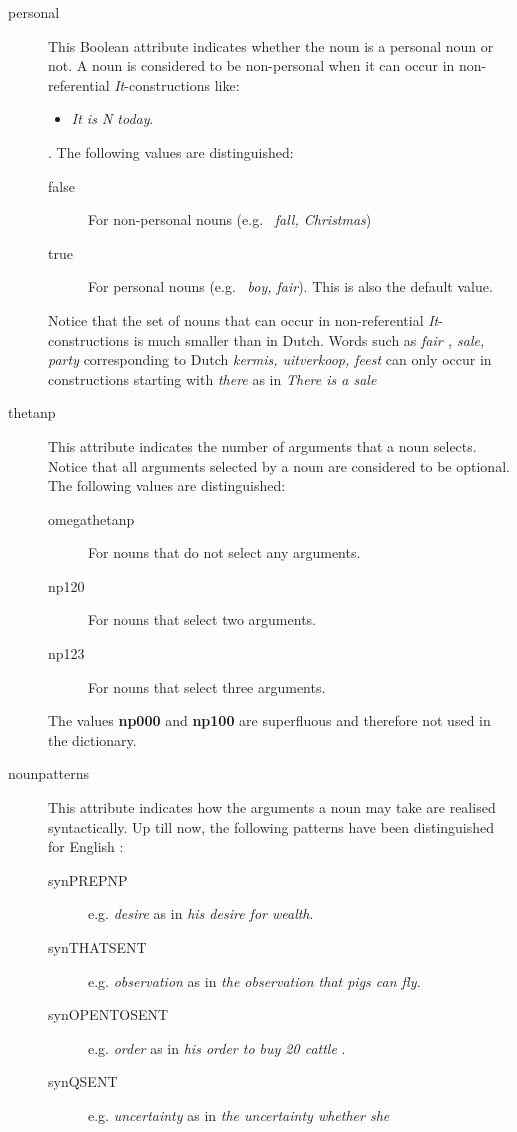\begin{description}
\item[personal] This Boolean attribute indicates whether the noun is a 
personal noun or not. A noun is considered to be non-personal when it can 
occur in non-referential {\em It\/}-constructions like:
\begin{itemize} 
\item {\em It is N today\/}.
\end{itemize}. The following values are distinguished:
\begin{description}
  \item [false] For non-personal nouns (e.g. \ {\em fall, Christmas\/})
  \item [true] For personal nouns (e.g. \ {\em boy, fair\/}). This is also the 
               default value. 
\end{description}
Notice that the set of nouns that can occur in non-referential 
{\em It\/}-constructions is much smaller than in Dutch. Words such as {\em fair
, sale, party} corresponding to Dutch {\em kermis, uitverkoop, feest} can only 
occur in constructions starting with {\em there} as in {\em There is a sale}
\item[thetanp] This attribute indicates the number of arguments that a noun 
selects. Notice that
all arguments selected by a noun are considered to be optional. The following 
values are distinguished:
\begin{description}
  \item [omegathetanp] For nouns that do not select any arguments.
  \item [np120] For nouns that select two arguments.
  \item [np123] For nouns that select three arguments.
\end{description}
The values {\bf np000} and {\bf np100} are superfluous and therefore not used in the 
dictionary.
\item[nounpatterns] This attribute indicates how the arguments a noun may 
take are realised syntactically. Up till now, the following patterns have 
been distinguished for English :
\begin{description}
  \item [synPREPNP] e.g. {\em desire} as in {\em his desire for wealth}.
  \item [synTHATSENT] e.g. {\em observation} as in {\em the observation that pigs 
can fly}.
  \item [synOPENTOSENT] e.g. {\em order} as in {\em his order to buy 20 cattle}
.
  \item [synQSENT] e.g. {\em uncertainty} as in {\em the uncertainty whether she 
}
\end{description}
\end{description}
